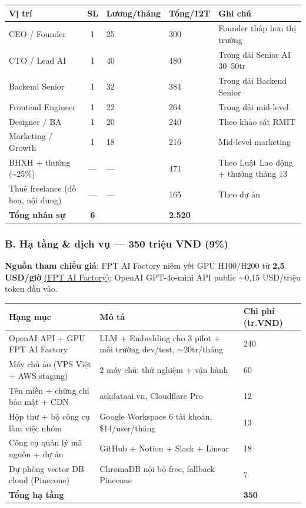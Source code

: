 \documentclass[11pt,a4paper]{article}
\begin{document}
\begin{longtable}{|L{4cm}|c|R{1.5cm}|R{1.5cm}|L{4cm}|}
\hline
{}\textbf{Vị trí} & \textbf{SL} & \textbf{Lương/tháng} & \textbf{Tổng/12T} & \textbf{Ghi chú} \\
\hline\endhead

CEO / Founder & 1 & 25 & 300 & Founder thấp hơn thị trường \\ \hline
CTO / Lead AI & 1 & 40 & 480 & Trong dải Senior AI 30--50tr \\ \hline
Backend Senior & 1 & 32 & 384 & Trong dải Backend Senior \\ \hline
Frontend Engineer & 1 & 22 & 264 & Trong dải mid-level \\ \hline
Designer / BA & 1 & 20 & 240 & Theo khảo sát RMIT \\ \hline
Marketing / Growth & 1 & 18 & 216 & Mid-level marketing \\ \hline
BHXH + thưởng (\textasciitilde 25\%) & --- & --- & 471 & Theo Luật Lao động + thưởng tháng 13 \\ \hline
Thuê freelance (đồ hoạ, nội dung) & --- & --- & 165 & Theo dự án \\ \hline
\textbf{Tổng nhân sự} & \textbf{6} & & \textbf{2.520} & \\ \hline

\end{longtable}

\subsubsection{B. Hạ tầng \& dịch vụ --- 350 triệu VND (9\%)}

\textbf{Nguồn tham chiếu giá}: FPT AI Factory niêm yết GPU H100/H200 từ \textbf{2,5 USD/giờ} \href{https://ai.fptcloud.com/pricing/}{(FPT AI Factory)}; OpenAI GPT-4o-mini API public $\sim$0,15 USD/triệu token đầu vào.

\begin{longtable}{|L{4.5cm}|L{6cm}|R{2.2cm}|}
\hline
{}\textbf{Hạng mục} & \textbf{Mô tả} & \textbf{Chi phí (tr.VND)} \\
\hline\endhead

OpenAI API + GPU FPT AI Factory & LLM + Embedding cho 3 pilot + môi trường dev/test, $\sim$20tr/tháng & 240 \\ \hline
Máy chủ ảo (VPS Việt + AWS staging) & 2 máy chủ: thử nghiệm + vận hành & 60 \\ \hline
Tên miền + chứng chỉ bảo mật + CDN & askdataai.vn, Cloudflare Pro & 12 \\ \hline
Hộp thư + bộ công cụ làm việc nhóm & Google Workspace 6 tài khoản, \$14/user/tháng & 13 \\ \hline
Công cụ quản lý mã nguồn + dự án & GitHub + Notion + Slack + Linear & 18 \\ \hline
Dự phòng vector DB cloud (Pinecone) & ChromaDB nội bộ free, fallback Pinecone & 7 \\ \hline
\textbf{Tổng hạ tầng} & & \textbf{350} \\ \hline

\end{longtable}
\end{document}
